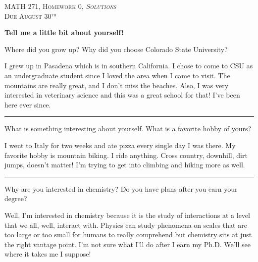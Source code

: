 \documentclass[12pt]{article} %
\begin{document}
\begin{center}
   \textsc{\large MATH 271, Homework 0, \emph{Solutions}}\\
   \textsc{Due August 30$^\textrm{th}$}
\end{center}

\begin{center}
    \textbf{Tell me a little bit about yourself!}
\end{center}

\begin{question}
    Where did you grow up? Why did you choose Colorado State University?
\end{question}

\begin{answer}
    I grew up in Pasadena which is in southern California.  I chose to come to CSU as an undergraduate student since I loved the area when I came to visit.  The mountains are really great, and I don't miss the beaches.  Also, I was very interested in veterinary science and this was a great school for that! I've been here ever since.
\end{answer}

\hrule

\begin{question}
    What is something interesting about yourself.  What is a favorite hobby of yours?
\end{question}

\begin{answer}
    I went to Italy for two weeks and ate pizza every single day I was there. My favorite hobby is mountain biking. I ride anything. Cross country, downhill, dirt jumps, doesn't matter!  I'm trying to get into climbing and hiking more as well.
\end{answer}

\hrule

\begin{question}
    Why are you interested in chemistry? Do you have plans after you earn your degree?
\end{question}

\begin{answer}
    Well, I'm interested in chemistry because it is the study of interactions at a level that we all, well, interact with.  Physics can study phenomena on scales that are too large or too small for humans to really comprehend but chemistry sits at just the right vantage point.  I'm not sure what I'll do after I earn my Ph.D. We'll see where it takes me I suppose!
\end{answer}
\end{document}
